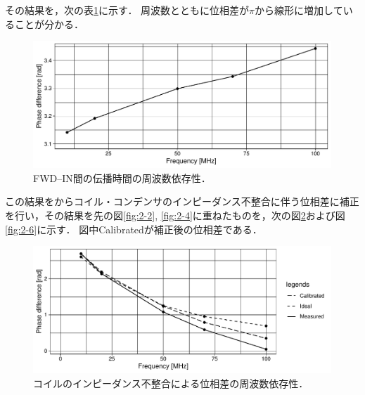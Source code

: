 \documentclass[uplatex,dvipdfmx,a4j,12pt]{jsarticle}
\begin{document}
その結果を，次の表\ref{table:2-5}に示す．
周波数とともに位相差が$\pi$から線形に増加していることが分かる．
\begin{figure}[H]
    \centering
    \includegraphics[width=\linewidth]{data/2_3/phase_diff.pdf}
    \caption{FWD--IN間の伝播時間の周波数依存性．}
    \label{table:2-5}
\end{figure}

この結果をからコイル・コンデンサのインピーダンス不整合に伴う位相差に補正を行い，その結果を先の図\ref{fig:2-2}, \ref{fig:2-4}に重ねたものを，次の図\ref{fig:2-5}および図\ref{fig:2-6}に示す．
図中Calibratedが補正後の位相差である．
\begin{figure}[H]
    \centering
    \includegraphics[width=\linewidth]{data/2_1/phase_diff2.pdf}
    \caption{コイルのインピーダンス不整合による位相差の周波数依存性．}
    \label{fig:2-5}
\end{figure}
\end{document}
